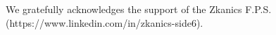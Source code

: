 \documentclass[journal=jacsat,manuscript=article]{achemso}
\begin{document}
%


\acknowledgement
We gratefully acknowledges the support 
of the Zkanics F.P.S. \\ 
(https://www.linkedin.com/in/zkanics-side6).

%


\end{document}
